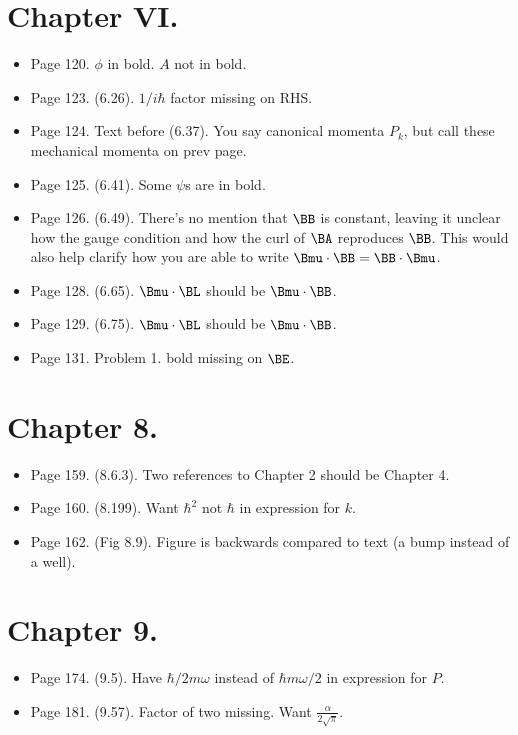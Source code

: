\section{Chapter VI.}
\begin{itemize}
\item Page 120.  $\phi$ in bold.  $A$ not in bold.
\item Page 123.  (6.26).  $1/i \hbar$ factor missing on RHS.
\item Page 124.  Text before (6.37).  You say canonical momenta $P_k$, but call these mechanical momenta on prev page.
\item Page 125.  (6.41).  Some $\psi$s are in bold.
\item Page 126.  (6.49).  There's no mention that $\BB$ is constant, leaving it unclear how the gauge condition and how the curl of $\BA$ reproduces $\BB$.  This would also help clarify how you are able to write $\Bmu \cdot \BB = \BB \cdot \Bmu$.
\item Page 128.  (6.65).  $\Bmu \cdot \BL$ should be $\Bmu \cdot \BB$.
\item Page 129.  (6.75).  $\Bmu \cdot \BL$ should be $\Bmu \cdot \BB$.
\item Page 131.  Problem 1.  bold missing on $\BE$.
\end{itemize}

\section{Chapter 8.}
\begin{itemize}
\item Page 159.  (8.6.3).  Two references to Chapter 2 should be Chapter 4.
\item Page 160.  (8.199).  Want $\hbar^2$ not $\hbar$ in expression for $k$.
\item Page 162.  (Fig 8.9).  Figure is backwards compared to text (a bump instead of a well).
\end{itemize}

\section{Chapter 9.}
\begin{itemize}
\item Page 174.  (9.5).  Have $\hbar/2m\omega$ instead of $\hbar m \omega/2$ in expression for $P$.
\item Page 181.  (9.57).  Factor of two missing.  Want $\frac{\alpha}{2 \sqrt{\pi}}$.
\end{itemize}

